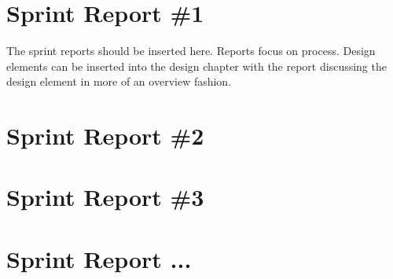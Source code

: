 

\section{Sprint Report \#1}
The sprint reports should be inserted here.     Reports focus on process.  Design elements can be inserted into the design chapter with the report discussing the design element in more of an overview fashion.

\section{Sprint Report \#2}

\section{Sprint Report \#3}

\section{Sprint Report ...}
